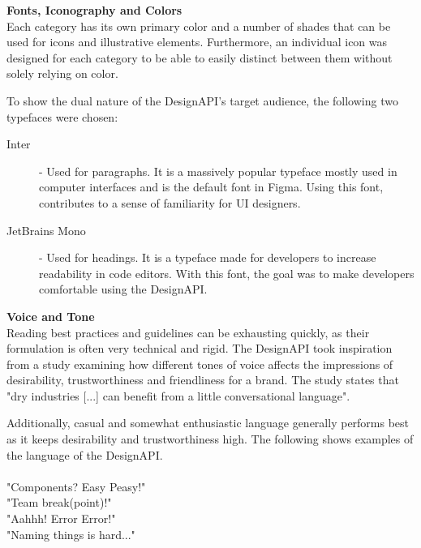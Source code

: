 \textbf{Fonts, Iconography and Colors}\\
Each category has its own primary color and a number of shades that can be used for icons and
illustrative elements. Furthermore, an individual icon was designed for each category to be able to
easily distinct between them without solely relying on color.

To show the dual nature of the DesignAPI's target audience, the following two typefaces were chosen:
\begin{description}
    \item[Inter] - Used for paragraphs. It is a massively popular typeface mostly used in
          computer interfaces and is the default font in Figma. Using this font, contributes to a sense of
          familiarity for UI designers. 

    \item[JetBrains Mono] - Used for headings. It is a typeface made for developers to increase
          readability in code editors. With this font, the goal was to make developers comfortable using
          the DesignAPI. 
\end{description}

\textbf{Voice and Tone}\\
Reading best practices and guidelines can be exhausting quickly, as their formulation is often very
technical and rigid. The DesignAPI took inspiration from a study examining how different tones of
voice affects the impressions of desirability, trustworthiness and friendliness for a brand. 
The study states that "dry industries [...] can benefit from a little conversational language".

Additionally, casual and somewhat enthusiastic language generally performs best as it keeps
desirability and trustworthiness high. 
The following shows examples of the language of the DesignAPI.\\\\
"Components? Easy Peasy!"\\
"Team break(point)!"\\
"Aahhh! Error Error!"\\
"Naming things is hard..."\\
